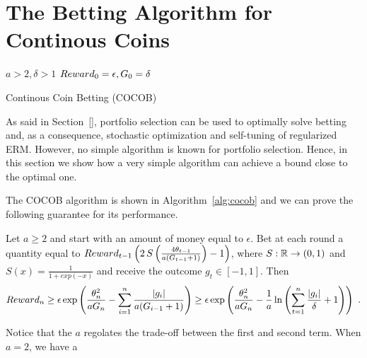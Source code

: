 \section{The Betting Algorithm for Continous Coins}
\label{sec:algo}

\begin{algorithm}[t]
  \begin{algorithmic}
  {
     $a>2,\delta>1$
     $Reward_0=\epsilon,G_0=\delta$
    \ENDFOR
  }
  \end{algorithmic}
  \caption{Continous Coin Betting (COCOB)}
  \label{alg:cocob}
\end{algorithm}

As said in Section~\ref{}, portfolio selection can be used to optimally solve betting and, as a consequence, stochastic optimization and self-tuning of regularized \ac{ERM}. However, no simple algorithm is known for portfolio selection.
Hence, in this section we show how a very simple algorithm can achieve a bound close to the optimal one.

The \ac{COCOB} algorithm is shown in Algorithm~\ref{alg:cocob} and we can prove the following guarantee for its performance.
%
\begin{theorem}
\label{theo:cocob}
Let $a\geq2$ and start with an amount of money equal to $\epsilon$. Bet at each round a quantity equal to
$Reward_{t-1} \left(2 \, S\left(\frac{4 \theta_{t-1}}{a (G_{t-1} + 1)}\right)-1\right)$, where $S:\mathbb{R}\rightarrow(0,1)$ and $S(x)=\frac{1}{1+exp(-x)}$ and receive the outcome $g_t \in [-1,1]$. Then
\begin{align*}
Reward_{n} 
\geq \epsilon \exp\left(\frac{\theta_{n}^2}{a G_{n}} - \sum_{i=1}^{n} \frac{|g_i|}{a( G_{i-1} + 1) } \right)
\geq \epsilon \exp\left(\frac{\theta_{n}^2}{a G_{n}} - \frac{1}{a} \ln \left(\sum_{t=1}^n \frac{|g_i|}{\delta}+1\right) \right)~.
\end{align*}
\end{theorem}
%
Notice that the $a$ regolates the trade-off between the first and second term. When $a=2$, we have a 